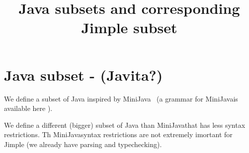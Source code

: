 \documentclass{report}
\newcommand{\minijava}{MiniJava}
\begin{document}
\title{Java subsets and corresponding Jimple subset}

\maketitle



\section{Java subset - (Javita?)}
We define a subset of Java inspired by \minijava~\cite{} (a grammar
for \minijava is available here \label{sec:minijava}).

We define a different (bigger) subset of Java than \minijava that has
less syntax restrictions.
%
Th \minijava syntax restrictions are not extremely imortant for
Jimple (we already have parsing and typechecking).
\end{document}

